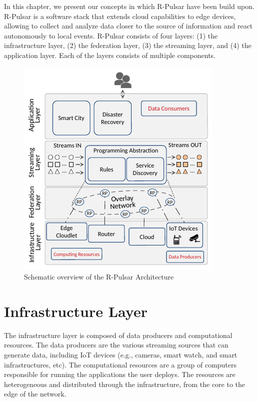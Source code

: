 In this chapter, we present our concepts in which R-Pulsar have been build upon. R-Pulsar is a software stack that extends cloud capabilities to edge devices, allowing to collect and analyze data closer to the source of information and react autonomously to local events. R-Pulsar consists of four layers: (1) the infrastructure layer, (2) the federation layer, (3) the streaming layer, and (4) the application layer. Each of the layers consists of multiple components.

\begin{figure}[!h]
  \centering
  \includegraphics[width=0.7\columnwidth]{Figures/R-PulsarArch.pdf}
  \caption{Schematic overview of the R-Pulsar Architecture}\label{fig:R-PulsarArch}
\end{figure}

\section{Infrastructure Layer}
The infrastructure layer is composed of data producers and computational resources. The data producers are the various streaming sources that can generate data, including IoT devices (e.g., cameras, smart watch, and smart infrastructures, etc). The computational resources are a group of computers responsible for running the applications the user deploys. The resources are heterogeneous and distributed through the infrastructure, from the core to the edge of the network. 

